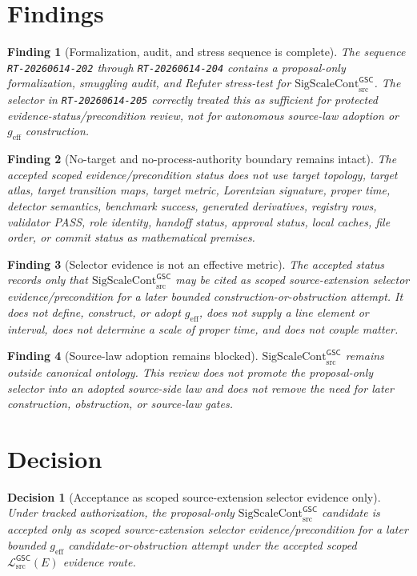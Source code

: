 \documentclass[11pt]{article}
\newcommand{\MetricData}{\mathcal{L}_{\mathrm{src}}^{\mathsf{GSC}}}
\newcommand{\geff}{g_{\mathrm{eff}}}
\newcommand{\SigScaleCont}{\mathrm{SigScaleCont}_{\mathrm{src}}^{\mathsf{GSC}}}
\newtheorem{decision}{Decision}
\newtheorem{finding}{Finding}
\begin{document}
\section{Findings}

\begin{finding}[Formalization, audit, and stress sequence is complete]
The sequence \texttt{RT-20260614-202} through \texttt{RT-20260614-204}
contains a proposal-only formalization, smuggling audit, and Refuter
stress-test for \(\SigScaleCont\). The selector in
\texttt{RT-20260614-205} correctly treated this as sufficient for protected
evidence-status/precondition review, not for autonomous source-law adoption or
\(\geff\) construction.
\end{finding}

\begin{finding}[No-target and no-process-authority boundary remains intact]
The accepted scoped evidence/precondition status does not use target topology,
target atlas, target transition maps, target metric, Lorentzian signature,
proper time, detector semantics, benchmark success, generated derivatives,
registry rows, validator PASS, role identity, handoff status, approval status,
local caches, file order, or commit status as mathematical premises.
\end{finding}

\begin{finding}[Selector evidence is not an effective metric]
The accepted status records only that \(\SigScaleCont\) may be cited as scoped
source-extension selector evidence/precondition for a later bounded
construction-or-obstruction attempt. It does not define, construct, or adopt
\(\geff\), does not supply a line element or interval, does not determine a
scale of proper time, and does not couple matter.
\end{finding}

\begin{finding}[Source-law adoption remains blocked]
\(\SigScaleCont\) remains outside canonical ontology. This review does not
promote the proposal-only selector into an adopted source-side law and does
not remove the need for later construction, obstruction, or source-law gates.
\end{finding}

\section{Decision}

\begin{decision}[Acceptance as scoped source-extension selector evidence only]
Under tracked authorization, the proposal-only \(\SigScaleCont\) candidate is
accepted only as scoped source-extension selector evidence/precondition for a
later bounded \(\geff\) candidate-or-obstruction attempt under the accepted
scoped \(\MetricData(E)\) evidence route.
\end{decision}
\end{document}
